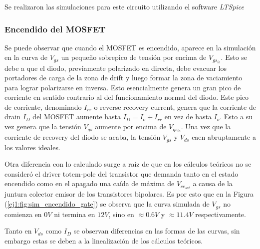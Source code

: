 Se realizaron las simulaciones para este circuito utilizando el software \textit{LTSpice} %
%

\subsubsection{Encendido del MOSFET}

Se puede observar que cuando el MOSFET es encendido, aparece en la simulación en la curva de $V_{gs}$ un pequeño sobrepico de tensión por encima de $V_{gs_{io}}$. Esto se debe a que el diodo, previamente polarizado en directa, debe evacuar los portadores de carga de la zona de drift y luego formar la zona de vaciamiento para lograr polarizarse en inversa. Esto esencialmente genera un gran pico de corriente en sentido contrario al del funcionamiento normal del diodo. Este pico de corriente, denominado $I_{rr}$ o reverse recovery current, genera que la corriente de drain $I_D$ del MOSFET aumente hasta $I_D = I_o+I_{rr}$ en vez de hasta $I_o$. Esto a su vez genera que la tensión $V_{gs}$ aumente por encima de $V_{gs_{io}}$. Una vez que la corriente de recovery del diodo se acaba, la tensión $V_{gs}$ y $V_{ds}$ caen abruptamente a los valores ideales.

Otra diferencia con lo calculado surge a raíz de que en los cálculos teóricos no se consideró el driver totem-pole del transistor que demanda tanto en el estado encendido como en el apagado una caída de máxima de $V_{ce_{sat}}$ a causa de la juntura colector emisor de los transistores bipolares. Es por esto que en la Figura (\ref{ej1:fig:sim_encendido_gate}) se observa que la curva simulada de $V_{gs}$ no comienza en $0V$ ni termina en $12V$, sino en $\approx 0.6V$ y $\approx 11.4V$ respectivamente.

Tanto en $V_{ds}$ como $I_D$ se observan diferencias en las formas de las curvas, sin embargo estas se deben a la linealización de los cálculos teóricos.

